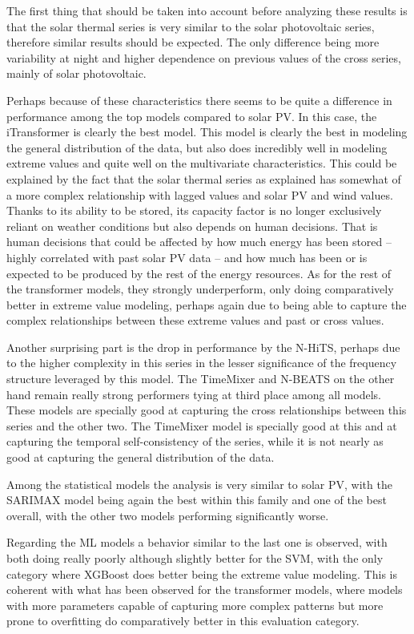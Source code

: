 The first thing that should be taken into account before analyzing these results is that the solar thermal series is very similar to the solar photovoltaic series, therefore similar results should be expected. The only difference being more variability at night and higher dependence on previous values of the cross series, mainly of solar photovoltaic. 

Perhaps because of these characteristics there seems to be quite a difference in performance among the top models compared to solar PV. In this case, the iTransformer is clearly the best model. This model is clearly the best in modeling the general distribution of the data, but also does incredibly well in modeling extreme values and quite well on the multivariate characteristics. This could be explained by the fact that the solar thermal series as explained has somewhat of a more complex relationship with lagged values and solar PV and wind values. Thanks to its ability to be stored, its capacity factor is no longer exclusively reliant on weather conditions but also depends on human decisions. That is human decisions that could be affected by how much energy has been stored -- highly correlated with past solar PV data -- and how much has been or is expected to be produced by the rest of the energy resources. As for the rest of the transformer models, they strongly underperform, only doing comparatively better in extreme value modeling, perhaps again due to being able to capture the complex relationships between these extreme values and past or cross values. 

Another surprising part is the drop in performance by the N-HiTS, perhaps due to the higher complexity in this series in the lesser significance of the frequency structure leveraged by this model. The TimeMixer and N-BEATS on the other hand remain really strong performers tying at third place among all models. These models are specially good at capturing the cross relationships between this series and the other two. The TimeMixer model is specially good at this and at capturing the temporal self-consistency of the series, while it is not nearly as good at capturing the general distribution of the data.

Among the statistical models the analysis is very similar to solar PV, with the SARIMAX model being again the best within this family and one of the best overall, with the other two models performing significantly worse. 

Regarding the ML models a behavior similar to the last one is observed, with both doing really poorly although slightly better for the SVM, with the only category where XGBoost does better being the extreme value modeling. This is coherent with what has been observed for the transformer models, where models with more parameters capable of capturing more complex patterns but more prone to overfitting do comparatively better in this evaluation category. 

